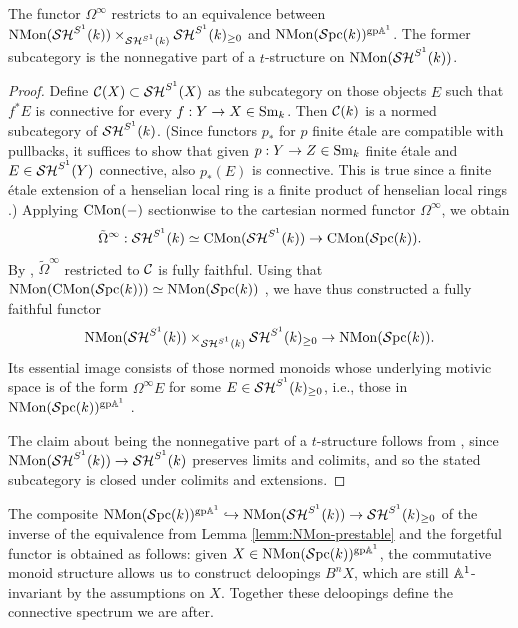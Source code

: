 \documentclass{amsart}
\numberwithin{proposition}{section}
\numberwithin{equation}{section}
\def\NMon{\mathrm{NMon}}
\begin{document}
\begin{lemma} \label{lemm:NMon-prestable}
The functor $\Omega^\infty$ restricts to an equivalence between $\NMon(\SH^{S^1}(k)) \times_{\SH^{S^1}(k)} \SH^{S^1}(k)_{\ge 0}$ and $\NMon(\Spc(k))^{\gp\A^1}$.
The former subcategory is the nonnegative part of a $t$-structure on $\NMon(\SH^{S^1}(k))$.
\end{lemma}
\begin{proof}
Define $\mathcal C(X) \subset \mathcal{SH}^{S^1}(X)$ as the subcategory on those objects $E$ such that $f^* E$ is connective for every $f: Y \to X \in {\mathrm{S}\mathrm{m}}_k$.
Then $\mathcal C(k)$ is a normed subcategory of $\mathcal{SH}^{S^1}(k)$.
(Since functors $p_*$ for $p$ finite étale are compatible with pullbacks, it suffices to show that given $p: Y \to Z \in {\mathrm{S}\mathrm{m}}_k$ finite étale and $E \in \mathcal{SH}^{S^1}(Y)$ connective, also $p_*(E)$ is connective.
This is true since a finite étale extension of a henselian local ring is a finite product of henselian local rings \cite[Tag~04GH]{stacks-project}.)
Applying $\mathrm{CMon}(\mathord-)$ sectionwise to the cartesian normed functor $\Omega^\infty$, we obtain \[ \tilde\Omega^\infty: \mathcal{SH}^{S^1}(k) \simeq \mathrm{CMon}(\mathcal{SH}^{S^1}(k)) \to \mathrm{CMon}(\mathcal{S}\mathrm{pc}{}(k)). \]
By \cite[Proposition~3.1.9]{EHKSY}, $\tilde\Omega^\infty$ restricted to $\mathcal C$ is fully faithful.
Using that $\NMon(\CMon(\Spc(k))) \wequi \NMon(\Spc(k))$ \cite[Proposition C.10]{bachmann-norms}, we have thus constructed a fully faithful functor \[ \NMon(\SH^{S^1}(k)) \times_{\SH^{S^1}(k)} \SH^{S^1}(k)_{\ge 0} \to \NMon(\Spc(k)). \]
Its essential image consists of those normed monoids whose underlying motivic space is of the form $\Omega^\infty E$ for some $E \in \mathcal{SH}^{S^1}(k)_{\ge 0}$, i.e., those in $\NMon(\Spc(k))^{\gp\A^1}$ \cite[Corollary~3.1.15]{EHKSY}.

The claim about being the nonnegative part of a $t$-structure follows from \cite[Proposition~1.4.4.11]{lurie-ha}, since $\NMon(\SH^{S^1}(k)) \to \SH^{S^1}(k)$ preserves limits and colimits, and so the stated subcategory is closed under colimits and extensions.
\end{proof}

\begin{remark}
The composite $\NMon(\Spc(k))^{\gp\A^1} \hookrightarrow \NMon(\SH^{S^1}(k)) \to \SH^{S^1}(k)_{\ge 0}$ of the inverse of the equivalence from Lemma \ref{lemm:NMon-prestable} and the forgetful functor is obtained as follows: given $X \in \NMon(\Spc(k))^{\gp\A^1}$, the commutative monoid structure allows us to construct deloopings $B^n X$, which are still $\mathbb A^1$-invariant by the assumptions on $X$.
Together these deloopings define the connective spectrum we are after.
\end{remark}
\end{document}

